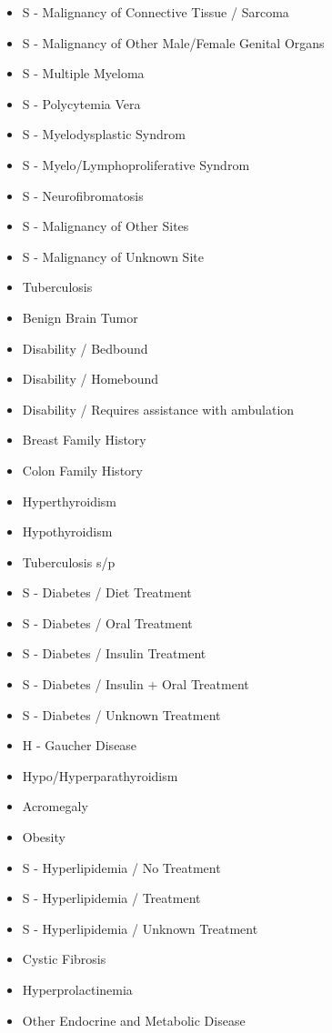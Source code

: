\documentclass[a4paper,12pt]{article}
\begin{document}
\begin{appendices}
\begin{itemize}
   			\item S - Malignancy of Connective Tissue / Sarcoma
   			\item S - Malignancy of Other Male/Female Genital Organs
   			\item S - Multiple Myeloma
   			\item S - Polycytemia Vera
   			\item S - Myelodysplastic Syndrom
   			\item S - Myelo/Lymphoproliferative Syndrom
   			\item S - Neurofibromatosis
   			\item S - Malignancy of Other Sites
   			\item S - Malignancy of Unknown Site
   			\item Tuberculosis
   			\item Benign Brain Tumor
   			\item Disability / Bedbound
   			\item Disability / Homebound
   			\item Disability / Requires assistance with ambulation
   			\item Breast Family History
   			\item Colon Family History
   			\item Hyperthyroidism
   			\item Hypothyroidism
   			\item Tuberculosis s/p
   			\item S - Diabetes / Diet Treatment
   			\item S - Diabetes / Oral Treatment
   			\item S - Diabetes / Insulin Treatment
   			\item S - Diabetes / Insulin + Oral Treatment
   			\item S - Diabetes / Unknown Treatment
   			\item H - Gaucher Disease
   			\item Hypo/Hyperparathyroidism
   			\item Acromegaly
   			\item Obesity
   			\item S - Hyperlipidemia / No Treatment
   			\item S - Hyperlipidemia / Treatment
   			\item S - Hyperlipidemia / Unknown Treatment
   			\item Cystic Fibrosis
   			\item Hyperprolactinemia
   			\item Other Endocrine and Metabolic Disease

\end{itemize}
\end{appendices}
\end{document}

